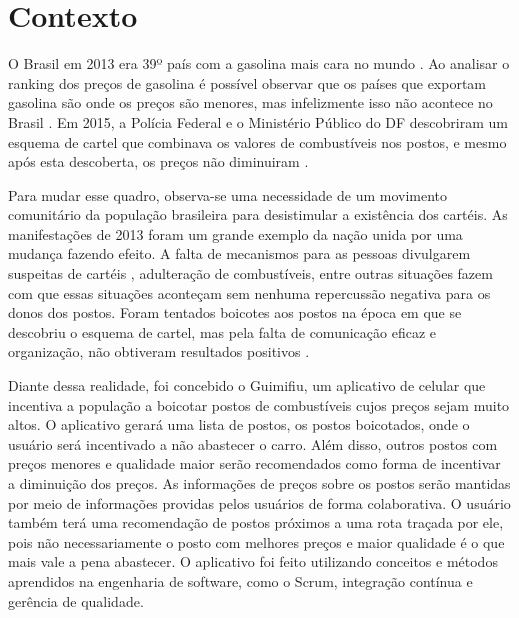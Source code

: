 \section{Contexto}

O Brasil em 2013 era 39º país com a gasolina mais cara no mundo \cite{oglobo}. Ao analisar o ranking dos preços de gasolina é possível observar que os países que exportam gasolina são onde os preços são menores, mas infelizmente isso não acontece no Brasil \cite{ranking-precos}. Em 2015, a Polícia Federal e o Ministério Público do DF descobriram um esquema de cartel que combinava os valores de combustíveis nos postos, e mesmo após esta descoberta, os preços não diminuiram \cite{correio-cartel}.

Para mudar esse quadro, observa-se uma necessidade de um movimento comunitário da população brasileira para desistimular a existência dos cartéis. As manifestações de 2013 foram um grande exemplo da nação unida por uma mudança fazendo efeito. A falta de mecanismos para as pessoas divulgarem suspeitas de cartéis \cite{manifestacoes-2013}, adulteração de combustíveis, entre outras situações fazem com que essas situações aconteçam sem nenhuma repercussão negativa para os donos dos postos. Foram tentados boicotes aos postos na época em que se descobriu o esquema de cartel, mas pela falta de comunicação eficaz e organização, não obtiveram resultados positivos \cite{boicotes-2016}.

Diante dessa realidade, foi concebido o Guimifiu, um aplicativo de celular que incentiva a população a boicotar postos de combustíveis cujos preços sejam muito altos. O aplicativo gerará uma lista de postos, os postos boicotados, onde o usuário será incentivado a não abastecer o carro. Além disso, outros postos com preços menores e qualidade maior serão recomendados como forma de incentivar a diminuição dos preços. As informações de preços sobre os postos serão mantidas por meio de informações providas pelos usuários de forma colaborativa. O usuário também terá uma recomendação de postos próximos a uma rota traçada por ele, pois não necessariamente o posto com melhores preços e maior qualidade é o que mais vale a pena abastecer. O aplicativo foi feito utilizando conceitos e métodos aprendidos na engenharia de software, como o Scrum, integração contínua e gerência de qualidade.
